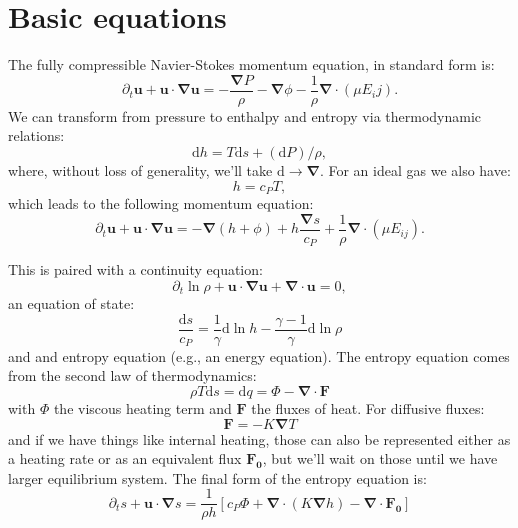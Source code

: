 \documentclass{aastex631}
\newcommand{\del}{\nabla}
\renewcommand{\vec}{\boldsymbol}
\newcommand{\grad}{\vec{\del}}
\renewcommand{\d}{\mathrm{d}}
\begin{document}
\section{Basic equations}
The fully compressible Navier-Stokes momentum equation, in standard form is:
\begin{equation}
  \partial_t \vec{u} + \vec{u}\cdot\grad\vec{u} = -\frac{\grad P}{\rho} - \grad \phi - \frac{1}{\rho}\grad \cdot (\mu E_ij).
\end{equation}
We can transform from pressure to enthalpy and entropy via thermodynamic relations:
\begin{equation}
  \d h = T \d s + (\d P)/\rho,
\end{equation}
where, without loss of generality, we'll take $\d \rightarrow \grad$.  For an ideal gas we also have:
\begin{equation}
  h = c_P T,
\end{equation}
which leads to the following momentum equation:
\begin{equation}
  \partial_t \vec{u} + \vec{u}\cdot\grad\vec{u} = -\grad (h + \phi) + h \frac{\grad s}{c_P} + \frac{1}{\rho}\grad \cdot (\mu E_{ij}).
\end{equation}

This is paired with a continuity equation:
\begin{equation}
  \partial_t \ln \rho + \vec{u} \cdot \grad \vec{u} + \grad \cdot \vec{u} = 0,
\end{equation}
an equation of state:
\begin{equation}
 \frac{\d s}{c_P} = \frac{1}{\gamma} \d \ln h - \frac{\gamma - 1}{\gamma}\d \ln \rho
\end{equation}
and and entropy equation (e.g., an energy equation).  The entropy equation comes from the second law of thermodynamics:
\begin{equation}
  \rho T \d s = \d q = \Phi - \grad \cdot \vec{F}
\end{equation}
with $\Phi$ the viscous heating term and $\vec{F}$ the fluxes of heat.  For diffusive fluxes:
\begin{equation}
  \vec{F} = -K \grad T
\end{equation}
and if we have things like internal heating, those can also be represented either as a heating rate or as an equivalent flux $\vec{F_0}$, but we'll wait on those until we have larger equilibrium system.  The final form of the entropy equation is:
\begin{equation}
  \partial_t s + \vec{u}\cdot\grad s = \frac{1}{\rho h}\left[c_P \Phi + \grad\cdot(K \grad h) - \grad\cdot\vec{F_0} \right]
\end{equation}
\end{document}
